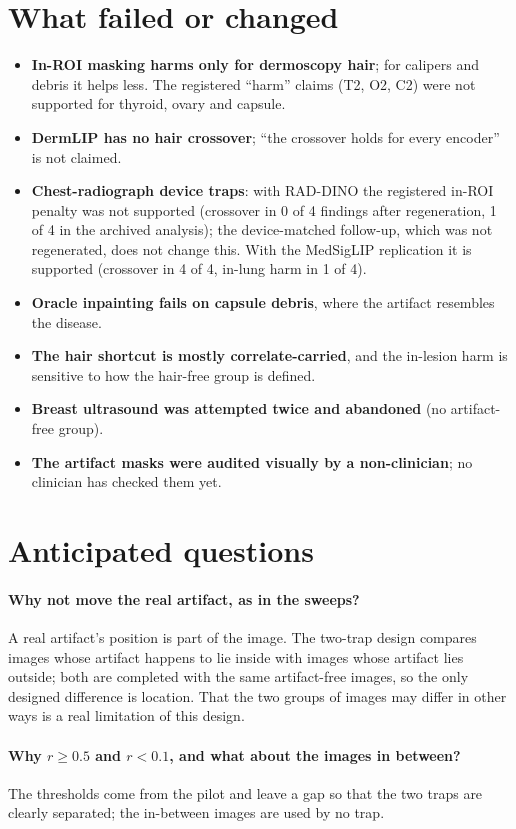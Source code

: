 \section{What failed or changed}
\begin{itemize}[leftmargin=*]\itemsep1pt
\item \textbf{In-ROI masking harms only for dermoscopy hair}; for calipers and debris it helps less. The registered
``harm'' claims (T2, O2, C2) were not supported for thyroid, ovary and capsule.
\item \textbf{DermLIP has no hair crossover}; ``the crossover holds for every encoder'' is not claimed.
\item \textbf{Chest-radiograph device traps}: with RAD-DINO the registered in-ROI penalty was not supported (crossover
in 0 of 4 findings after regeneration, 1 of 4 in the archived analysis); the device-matched follow-up, which was not
regenerated, does not change this. With the MedSigLIP replication it is supported (crossover in 4 of 4, in-lung harm in
1 of 4).
\item \textbf{Oracle inpainting fails on capsule debris}, where the artifact resembles the disease.
\item \textbf{The hair shortcut is mostly correlate-carried}, and the in-lesion harm is sensitive to how the hair-free
group is defined.
\item \textbf{Breast ultrasound was attempted twice and abandoned} (no artifact-free group).
\item \textbf{The artifact masks were audited visually by a non-clinician}; no clinician has checked them yet.
\end{itemize}

\section{Anticipated questions}
\paragraph{Why not move the real artifact, as in the sweeps?} A real artifact's position is part of the image. The
two-trap design compares images whose artifact happens to lie inside with images whose artifact lies outside; both are
completed with the same artifact-free images, so the only designed difference is location. That the two groups of
images may differ in other ways is a real limitation of this design.
\paragraph{Why $r\ge0.5$ and $r<0.1$, and what about the images in between?} The thresholds come from the pilot and
leave a gap so that the two traps are clearly separated; the in-between images are used by no trap.
